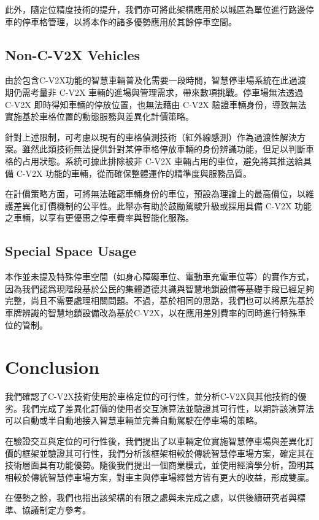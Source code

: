 \documentclass[sigconf,authorversion,nonacm,screen]{acmart}
\begin{document}
此外，隨定位精度技術的提升，我們亦可將此架構應用於以城區為單位進行路邊停車的停車格管理，以將本作的諸多優勢應用於其餘停車空間。

\subsection{Non-C-V2X Vehicles}
\quad 由於包含C-V2X功能的智慧車輛普及化需要一段時間，智慧停車場系統在此過渡期仍需考量非 C-V2X 車輛的進場與管理需求，帶來數項挑戰。停車場無法透過 C-V2X 即時得知車輛的停放位置，也無法藉由 C-V2X 驗證車輛身份，導致無法實施基於車格位置的動態服務與差異化計價策略。

針對上述限制，可考慮以現有的車格偵測技術（紅外線感測）作為過渡性解決方案。雖然此類技術無法提供針對某停車格停放車輛的身份辨識功能，但足以判斷車格的占用狀態。系統可據此排除被非 C-V2X 車輛占用的車位，避免將其推送給具備 C-V2X 功能的車輛，從而確保整體運作的精準度與服務品質。

在計價策略方面，可將無法確認車輛身份的車位，預設為理論上的最高價位，以維護差異化訂價機制的公平性。此舉亦有助於鼓勵駕駛升級或採用具備 C-V2X 功能之車輛，以享有更優惠之停車費率與智能化服務。
\subsection{Special Space Usage}

\quad 本作並未提及特殊停車空間（如身心障礙車位、電動車充電車位等）的實作方式，因為我們認爲現階段基於公民的集體道德共識與智慧地鎖設備等基礎手段已經足夠完整，尚且不需要處理相關問題。不過，基於相同的思路，我們也可以將原先基於車牌辨識的智慧地鎖設備改為基於C-V2X，以在應用差別費率的同時進行特殊車位的管制。

\section{Conclusion}

\quad 我們確認了C-V2X技術使用於車格定位的可行性，並分析C-V2X與其他技術的優劣。我們完成了差異化訂價的使用者交互演算法並驗證其可行性，以期許該演算法可以自動或半自動地接入智慧車輛並完善自動駕駛在停車場的策略。

在驗證交互與定位的可行性後，我們提出了以車輛定位實施智慧停車場與差異化訂價的框架並驗證其可行性，我們分析該框架相較於傳統智慧停車場方案，確定其在技術層面具有功能優勢。隨後我們提出一個商業模式，並使用經濟學分析，證明其相較於傳統智慧停車場方案，對車主與停車場經營方皆有更大的收益，形成雙贏。

在優勢之餘，我們也指出該架構的有限之處與未完成之處，以供後續研究者與標準、協議制定方參考。



\end{document}
